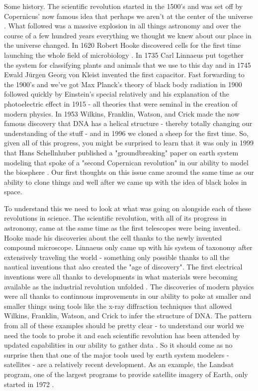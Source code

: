 \documentclass[11pt]{book}
\begin{document}
Some history. The scientific revolution started in the 1500's and was set off by Copernicus' now famous idea that perhaps we aren't at the center of the universe \cite{sbrush}. What followed was a massive explosion in all things astronomy and over the course of a few hundred years everything we thought we knew about our place in the universe changed. In 1620 Robert Hooke discovered cells for the first time launching the whole field of microbiology \cite{wsd}. In 1735 Carl Linnaeus put together the system for classifying plants and animals that we use to this day and in 1745 Ewald Jürgen Georg von Kleist invented the first capacitor. Fast forwarding to the 1900's and we've got Max Planck's theory of black body radiation in 1900 followed quickly by Einstein's special relatively and his explanation of the photoelectric effect in 1915 - all theories that were seminal in the creation of modern physics. In 1953 Wilkins, Franklin, Watson, and Crick made the now famous discovery that DNA has a helical structure - thereby totally changing our understanding of the stuff - and in 1996 we cloned a sheep for the first time. So, given all of this progress, you might be surprised to learn that it was only in 1999 that Hans Schellnhuber published a "groundbreaking" paper on earth system modeling that spoke of a "second Copernican revolution" in our ability to model the biosphere \cite{hschellnhuber}. Our first thoughts on this issue came around the same time as our ability to clone things and well after we came up with the idea of black holes in space. 

To understand this we need to look at what was going on alongside each of these revolutions in science. The scientific revolution, with all of its progress in astronomy, came at the same time as the first telescopes were being invented. Hooke made his discoveries about the cell thanks to the newly invented compound microscope. Linnaeus only came up with his system of taxonomy after extensively traveling the world - something only possible thanks to all the nautical inventions that also created the "age of discovery". The first electrical inventions were all thanks to developments in what materials were becoming available as the industrial revolution unfolded \cite{tkuhn}. The discoveries of modern physics were all thanks to continuous improvements in our ability to poke at smaller and smaller things using tools like the x-ray diffraction techniques that allowed Wilkins, Franklin, Watson, and Crick to infer the structure of DNA. The pattern from all of these examples should be pretty clear - to understand our world we need the tools to probe it and each scientific revolution has been attended by updated capabilities in our ability to gather data \cite{tkuhn}. So it should come as no surprise then that one of the major tools used by earth system modelers - satellites - are a relatively recent development. As an example, the Landsat program, one of the largest programs to provide satellite imagery of Earth, only started in 1972 \cite{wls}.
\end{document}
